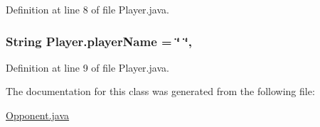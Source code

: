 Definition at line 8 of file Player.\-java.

\hypertarget{class_player_ae4fda097bcc40683e9b140bbee10d403}{
\subsubsection[{player\-Name}]{\setlength{\rightskip}{0pt plus 5cm}String Player.\-player\-Name = \char`\"{} \char`\"{}\hspace{0.3cm}{\ttfamily [package]}, {\ttfamily [inherited]}}}\label{class_player_ae4fda097bcc40683e9b140bbee10d403}


Definition at line 9 of file Player.\-java.



The documentation for this class was generated from the following file\-:\begin{DoxyCompactItemize}
\item 
\hyperlink{_opponent_8java}{Opponent.\-java}\end{DoxyCompactItemize}
